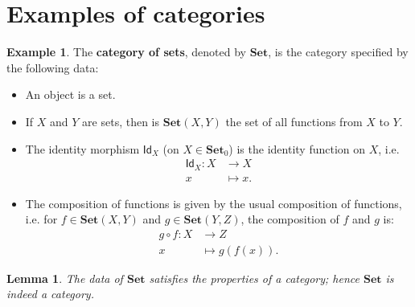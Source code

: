 \documentclass[a4paper,11pt, oneside,titlepage=false]{scrbook}
\theoremstyle{plain}
\newtheorem{lemma}[thm]{Lemma}
\theoremstyle{definition}
\newtheorem{exa}[thm]{Example}
\newcommand{\cfont}[1]{\ensuremath{\mathsf{#1}}}
\newcommand{\Catb}[1]{\mathbf{#1}}
\newcommand{\SET}{\Catb{Set}}
\newcommand{\Ob}[1]{{#1}_0}
\newcommand{\CHom}[3]{{#1}(#2,#3)}
\newcommand{\Id}[1][]{\cfont{Id}_{#1}}
\begin{document}
\section{Examples of categories}

\begin{exa}\label{example:set} The \textbf{category of sets}, denoted by $\SET$, is the category specified by the following data:
\begin{itemize}
\item An object is a set.
\item If $X$ and $Y$ are sets, then is $\CHom \SET X Y$ the set of all functions from $X$ to $Y$.
\item The identity morphism $\Id[X]$ (on $X\in\Ob{\SET}$) is the identity function on $X$, i.e.
\begin{align*}
  \Id[X] : X &\to X
  \\
  x &\mapsto x.
\end{align*}
\item The composition of functions is given by the usual composition of functions, i.e. for $f\in \CHom \SET X Y$ and $g\in \CHom \SET Y Z$, the composition of $f$ and $g$ is:
\begin{align*}
  g \circ f : X&\to Z
  \\
  x &\mapsto g(f(x)).
\end{align*}
\end{itemize}
\end{exa}
\begin{lemma}\label{lemma:set-category}
  The data of $\SET$ satisfies the properties of a category; hence $\SET$ is indeed a category.
\end{lemma}
\end{document}
